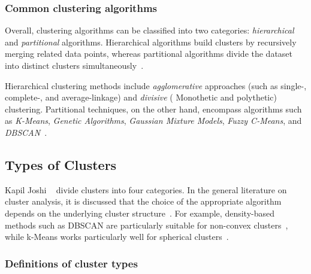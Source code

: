 \documentclass[10pt,twocolumn,letterpaper]{article}
\begin{document}

\subsubsection{Common clustering algorithms}\label{subsubsec:common-clustering-algorithms}

Overall, clustering algorithms can be classified into two categories:
\textit{hierarchical} and \textit{partitional} algorithms. Hierarchical
algorithms build clusters by recursively merging related data points, whereas
partitional algorithms divide the dataset into distinct clusters
simultaneously~\cite{Ezugwu2022104743,Jain2010651}.

Hierarchical clustering methods include \textit{agglomerative} approaches (such
as single-, complete-, and average-linkage) and \textit{divisive} (\eg
Monothetic and polythetic) clustering. Partitional techniques, on the other
hand, encompass algorithms such as \textit{K-Means}, \textit{Genetic
    Algorithms}, \textit{Gaussian Mixture Models}, \textit{Fuzzy C-Means}, and
\textit{DBSCAN}~\cite{Ezugwu2022104743}.


\subsection{Types of Clusters}\label{subsec:types-of-clusters}

Kapil Joshi \etal~\cite{Joshi2015} divide clusters into four categories. In the
general literature on cluster analysis, it is discussed that the choice of the
appropriate algorithm depends on the underlying cluster
structure~\cite{Ezugwu2022104743}. For example, density-based methods such as
DBSCAN are particularly suitable for non-convex clusters~\cite{Bhargav2016},
while k-Means works particularly well for spherical
clusters~\cite{Jain2010651}.

\theoremstyle{Definition}
\newtheorem{definition}{Definition}[subsubsection]

\subsubsection{Definitions of cluster types \cite{Joshi2015}}
\end{document}
